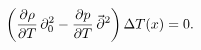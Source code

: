 \begin{equation}
\left(\frac{\partial \rho}{\partial T}\,\partial_0^2-
\frac{\partial p}{\partial T}\,
\smash{\vec{\mspace{.5mu}\partial}}^2\right)\Delta T(x)=0.
\end{equation}

